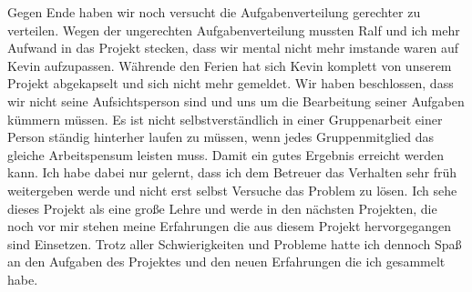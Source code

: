 Gegen Ende haben wir noch versucht die Aufgabenverteilung gerechter zu verteilen. 
Wegen der ungerechten Aufgabenverteilung mussten Ralf und ich mehr Aufwand in das Projekt stecken, dass wir mental nicht mehr imstande waren auf Kevin aufzupassen. 
Währende den Ferien hat sich Kevin komplett von unserem Projekt abgekapselt und sich nicht mehr gemeldet.
Wir haben beschlossen, dass wir nicht seine Aufsichtsperson sind und uns um die Bearbeitung seiner Aufgaben kümmern müssen. 
Es ist nicht selbstverständlich in einer Gruppenarbeit einer Person ständig hinterher laufen zu müssen,
wenn jedes Gruppenmitglied das gleiche Arbeitspensum leisten muss. Damit ein gutes Ergebnis erreicht werden kann.
Ich habe dabei nur gelernt, dass ich dem Betreuer das Verhalten sehr früh weitergeben werde und nicht erst selbst Versuche das Problem zu lösen.
Ich sehe dieses Projekt als eine große Lehre und werde in den nächsten Projekten, die noch vor mir stehen meine Erfahrungen die aus diesem Projekt hervorgegangen sind Einsetzen.
Trotz aller Schwierigkeiten und Probleme hatte ich dennoch Spaß an den Aufgaben des Projektes und den neuen Erfahrungen die ich gesammelt habe.